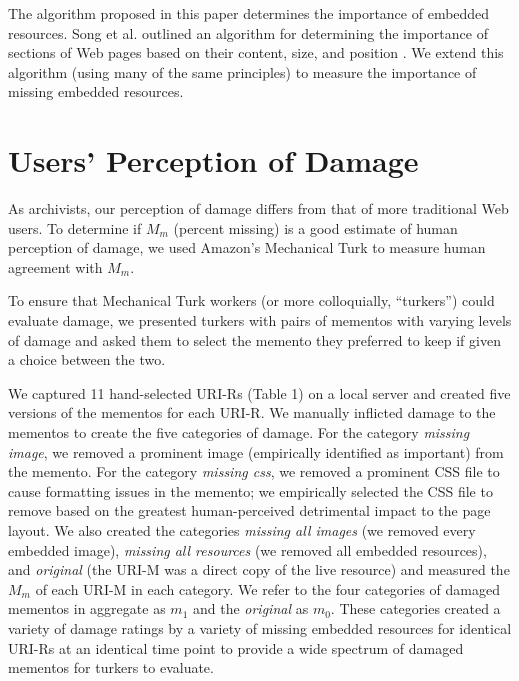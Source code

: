 The algorithm proposed in this paper determines the importance of embedded resources. Song et al. outlined an algorithm for determining the importance of sections of Web pages based on their content, size, and position \cite{blockImportance}. We extend this algorithm (using many of the same principles) to measure the importance of missing embedded resources. 



\section{Users' Perception of Damage}
\label{turk} 


As archivists, our perception of damage differs from that of more traditional Web users. To determine if $M_m$ (percent missing) is a good estimate of human perception of damage, we used Amazon's Mechanical Turk to measure human agreement with $M_m$.

To ensure that Mechanical Turk workers (or more colloquially, ``turkers'') could evaluate damage, we presented turkers with pairs of mementos with varying levels of damage and asked them to select the memento they preferred to keep if given a choice between the two.

We captured 11 hand-selected URI-Rs (Table 1) on a local server and created five versions of the mementos for each URI-R. We manually inflicted damage to the mementos to create the five categories of damage. For the category \emph{missing image}, we removed a prominent image (empirically identified as important) from the memento. For the category \emph{missing css}, we removed a prominent CSS file to cause formatting issues in the memento; we empirically selected the CSS file to remove based on the greatest human-perceived detrimental impact to the page layout. We also created the categories \emph{missing all images} (we removed every embedded image), \emph{missing all resources} (we removed all embedded resources), and \emph{original} (the URI-M was a direct copy of the live resource) and measured the $M_m$ of each URI-M in each category. We refer to the four categories of damaged mementos in aggregate as $m_1$ and the \emph{original} as $m_0$. These categories created a variety of damage ratings by a variety of missing embedded resources for identical URI-Rs at an identical time point to provide a wide spectrum of damaged mementos for turkers to evaluate.

